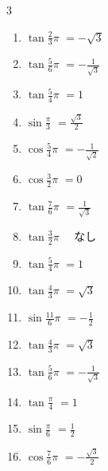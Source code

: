 \begin{multicols}{3}
\begin{enumerate}
  \item $\displaystyle \tan{\frac{2}{3}\pi}$
        $\displaystyle =-\sqrt{3}$

  \item $\displaystyle \tan{\frac{5}{6}\pi}$
        $\displaystyle =-\frac{1}{\sqrt{3}}$

  \item $\displaystyle \tan{\frac{5}{4}\pi}$
        $\displaystyle =1$

  \item $\displaystyle \sin{\frac{\pi}{3}}$
        $\displaystyle =\frac{\sqrt{3}}{2}$

  \item $\displaystyle \cos{\frac{5}{4}\pi}$
        $\displaystyle =-\frac{1}{\sqrt{2}}$

  \item $\displaystyle \cos{\frac{3}{2}\pi}$
        $\displaystyle =0$

  \item $\displaystyle \tan{\frac{7}{6}\pi}$
        $\displaystyle =\frac{1}{\sqrt{3}}$

  \item $\displaystyle \tan{\frac{3}{2}\pi}$
        $\displaystyle \quad なし$

  \item $\displaystyle \tan{\frac{5}{4}\pi}$
        $\displaystyle =1$

  \item $\displaystyle \tan{\frac{4}{3}\pi}$
        $\displaystyle =\sqrt{3}$

  \item $\displaystyle \sin{\frac{11}{6}\pi}$
        $\displaystyle =-\frac{1}{2}$

  \item $\displaystyle \tan{\frac{4}{3}\pi}$
        $\displaystyle =\sqrt{3}$

  \item $\displaystyle \tan{\frac{5}{6}\pi}$
        $\displaystyle =-\frac{1}{\sqrt{3}}$

  \item $\displaystyle \tan{\frac{\pi}{4}}$
        $\displaystyle =1$

  \item $\displaystyle \sin{\frac{\pi}{6}}$
        $\displaystyle =\frac{1}{2}$

  \item $\displaystyle \cos{\frac{7}{6}\pi}$
        $\displaystyle =-\frac{\sqrt{3}}{2}$


\end{enumerate}
\end{multicols}
